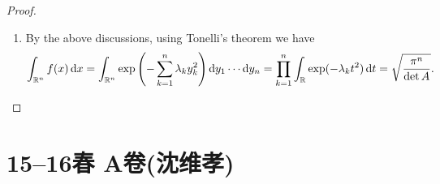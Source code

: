 \begin{itemize}
\begin{proof}
\begin{enumerate}
	Therefore, $ f\in L^{1}(\mathbb{R} ^{n}) $ iff $ \forall i=1,2,\cdots n,\lambda_{i}>0  $ iff $ A $ is positive definite.
	\item By the above discussions, using Tonelli's theorem we have 
	$$\int_{\mathbb{R}^n}{f(x)\,\mathrm{d}x}
    =\int_{\mathbb{R}^n}{\exp \left( -\sum_{k=1}^n{\lambda _ky_{k}^{2}} \right) \mathrm{d}y_1 \cdots \mathrm{d}y_n}
    =\prod_{k=1}^n{\int_{\mathbb{R}}{\exp(-\lambda_kt^2)\,\mathrm{d}t}}
    =\sqrt{\frac{\pi^{n}}{\det A}}.\qedhere$$
	\end{enumerate}
\end{proof}

\end{itemize}

\section{15--16春 A卷(沈维孝)}

